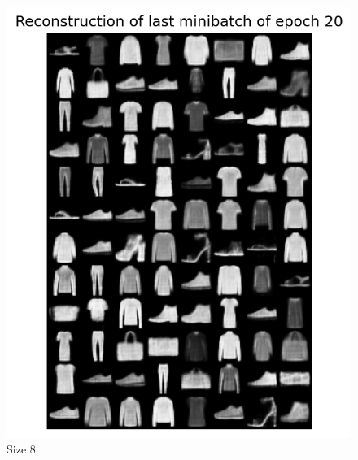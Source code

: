 \begin{enumerate}
 \begin{figure}[H]
   \centering
     \includegraphics[scale=0.6]
     {templates/re20_8}
     \caption{Size 8}
 \end{figure}


\end{enumerate}
